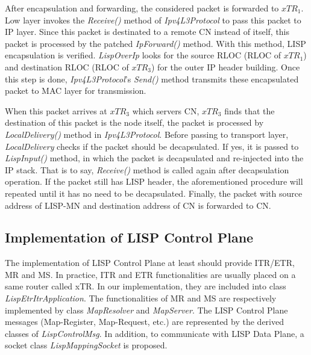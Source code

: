 After encapsulation and forwarding, the considered packet is forwarded to $xTR_1$. %
Low layer invokes the \emph{Receive()} method of \emph{Ipv4L3Protocol} to pass this packet to IP layer. Since this packet is destinated to a remote CN instead of itself, this packet is processed by the patched \emph{IpForward()} method. %
With this method, LISP encapsulation is verified. \emph{LispOverIp} looks for the source RLOC (RLOC of $xTR_1$) and destination RLOC (RLOC of $xTR_3$) for the outer IP header building. Once this step is done, \emph{Ipv4L3Protocol}'s \emph{Send()} method transmits these encapsulated packet to MAC layer for transmission.

When this packet arrives at $xTR_3$ which servers CN, $xTR_3$ finds that the destination of this packet is the node itself, the packet is processed by \emph{LocalDelivery()} method in \emph{Ipv4L3Protocol}. Before passing to transport layer, \emph{LocalDelivery} checks if the packet should be decapsulated. If yes, it is passed to \emph{LispInput()} method, in which the packet is decapsulated and re-injected into the IP stack. That is to say, \emph{Receive()} method is called again after decapsulation operation. If the packet still has LISP header, the aforementioned procedure will repeated until it has no need to be decapsulated. Finally, the packet with source address of LISP-MN and destination address of CN is forwarded to CN.

\subsection{Implementation of LISP Control Plane}
\label{subsec:control-plane-impl}
The implementation of LISP Control Plane at least should provide ITR/ETR, MR and MS. In practice, ITR and ETR functionalities are usually placed on a same router called xTR. In our implementation, they are included into class \emph{LispEtrItrApplication}. The functionalities of MR and MS are respectively implemented by class \emph{MapResolver} and \emph{MapServer}. The LISP Control Plane messages (Map-Register, Map-Request, etc.) are represented by the derived classes of \emph{LispControlMsg}. In addition, to communicate with LISP Data Plane, a socket class \emph{LispMappingSocket} is proposed.

